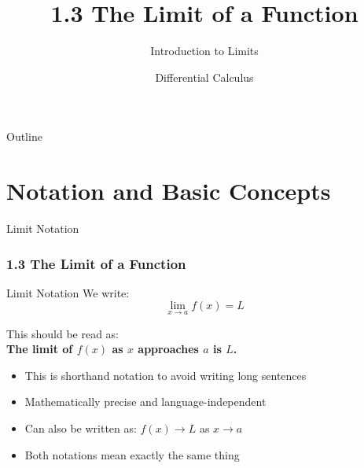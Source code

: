 \documentclass[aspectratio=169]{beamer}
\title{1.3 The Limit of a Function}
\subtitle{Introduction to Limits}
\author{Differential Calculus}
\date{}
\newcommand{\limx}[2]{\lim_{x \to #1} #2}
\begin{document}
\begin{frame}
\titlepage
\end{frame}

\begin{frame}{Outline}
\tableofcontents
\end{frame}

\section{Notation and Basic Concepts}

\begin{frame}{Limit Notation}
\frametitle{1.3 The Limit of a Function}

\begin{block}{Limit Notation}
We write:
$$\limx{a}{f(x)} = L$$

This should be read as:\\
\textbf{The limit of $f(x)$ as $x$ approaches $a$ is $L$.}
\end{block}

\begin{itemize}
\item This is shorthand notation to avoid writing long sentences
\item Mathematically precise and language-independent
\item Can also be written as: $f(x) \to L$ as $x \to a$
\item Both notations mean exactly the same thing
\end{itemize}

\end{frame}
\end{document}
